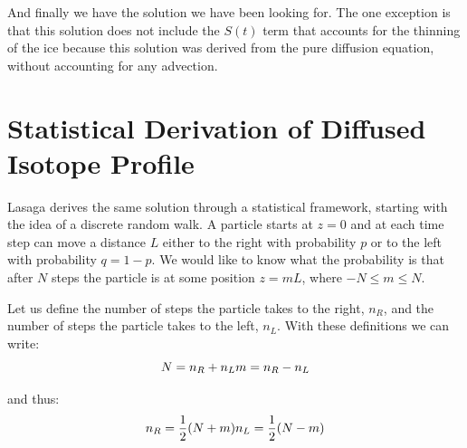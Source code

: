 \documentclass[draft, jgrga]{AGUTeX}
\begin{document}
\begin{article}
And finally we have the solution we have been looking for. The one exception is that this solution does not include the $S(t)$ term that accounts for the thinning of the ice because this solution was derived from the pure diffusion equation, without accounting for any advection.




\section{Statistical Derivation of Diffused Isotope Profile}

Lasaga derives the same solution through a statistical framework, starting with the idea of a discrete random walk. A particle starts at \begin{math} z = 0 \end{math} and at each time step can move a distance \begin{math} L \end{math} either to the right with probability \begin{math} p \end{math} or to the left with probability \begin{math} q = 1-p \end{math}. We would like to know what the probability is that after \begin{math} N \end{math} steps the particle is at some position \begin{math} z = mL \end{math}, where \begin{math} -N \leq m \leq N \end{math}.

Let us define the number of steps the particle takes to the right, \begin{math} n_R \end{math}, and the number of steps the particle takes to the left, \begin{math} n_L \end{math}. With these definitions we can write:
\begin{equation}
N = n_R + n_L \\
m = n_R - n_L
\end{equation}

and thus:
\begin{equation}
n_R = \frac{1}{2} (N+m) \\
n_L = \frac{1}{2} (N-m)
\end{equation}


\end{article}
\end{document}
